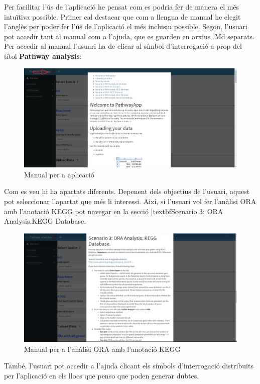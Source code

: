 Per facilitar l'ús de l’aplicació he pensat com es podria fer de manera el més intuïtiva possible. Primer cal destacar que com a llengua de manual he elegit l’anglès per poder fer l'ús de l'aplicació el més inclusiu possible. Segon, l'usuari pot accedir tant al manual com a l'ajuda, que es guarden en arxius .Md separats. Per accedir al manual l'usuari ha de clicar al símbol d’interrogació a prop del títol \textbf{Pathway analysis}:
\begin{figure}[H]
\centering
\includegraphics[width=1\textwidth]{figures/Manual.jpg} 
\caption{Manual per a aplicació}
\end{figure}

Com es veu hi ha apartats diferents. Depenent dels objectius de l'usuari, aquest pot seleccionar l'apartat que més li interessi. Així, si l'usuari vol fer l'anàlisi \gls{ORA} amb l'anotació KEGG pot navegar en la secció |textbf{Scenario 3: \gls{ORA} Analysis.\gls{KEGG} Database}. 

\begin{figure}[H]
\centering
\includegraphics[width=1\textwidth]{figures/Manual2.jpg} 
\caption{Manual per a l'anàlisi \gls{ORA} amb l'anotació \gls{KEGG}}
\end{figure}


També, l'usuari pot accedir a l'ajuda clicant els símbols d'interrogació distribuïts per l’aplicació en els llocs que penso que poden generar dubtes. 

